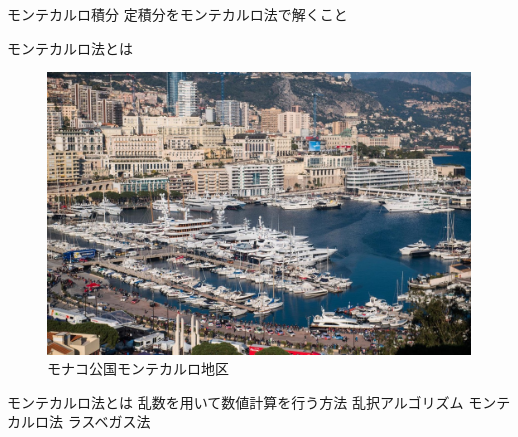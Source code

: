 \documentclass[dvipdfmx,xcolor={svgnames},17pt]{beamer}
\begin{document}
      \begin{frame}{モンテカルロ積分}
        定積分をモンテカルロ法で解くこと
      \end{frame}

      \begin{frame}{モンテカルロ法とは}
        \begin{figure}
          \centering
          \includegraphics[scale=0.15]{monte.jpg}
          \caption{モナコ公国モンテカルロ地区}
          \label{fig:two}
        \end{figure}
      \end{frame}

      \begin{frame}{モンテカルロ法とは}
        乱数を用いて数値計算を行う方法
        乱択アルゴリズム
          モンテカルロ法 
          ラスベガス法 
      \end{frame}
\end{document}
